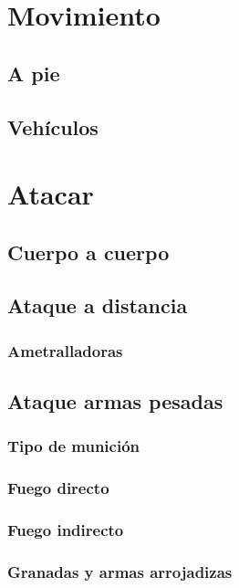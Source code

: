 \section{Movimiento}

    \subsection{A pie}

    \subsection{Vehículos}

\section{Atacar}

    \subsection{Cuerpo a cuerpo}

    \subsection{Ataque a distancia}

        \subsubsection{Ametralladoras}

    \subsection{Ataque armas pesadas}

        \subsubsection{Tipo de munición}

        \subsubsection{Fuego directo}

        \subsubsection{Fuego indirecto}

        \subsubsection{Granadas y armas arrojadizas}

